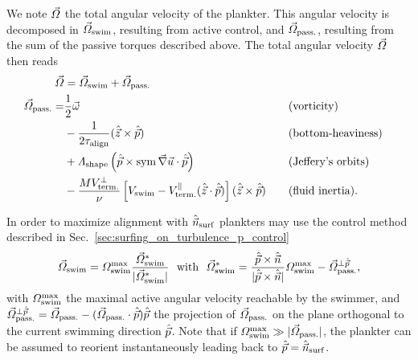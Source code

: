 We note $\vec{\varOmega}$ the total angular velocity of the plankter.
This angular velocity is decomposed in $\vec{\varOmega}_{\mathrm{swim}}$, resulting from active control, and $\vec{\varOmega}_{\mathrm{pass.}}$, resulting from the sum of the passive torques described above.
The total angular velocity $\vec{\varOmega}$ then reads
\begin{subequations}
	\begin{align}
		\vec{\varOmega} &= \vec{\varOmega}_{\mathrm{swim}} + \vec{\varOmega}_{\mathrm{pass.}}\\
		\vec{\varOmega}_{\mathrm{pass.}} = &\frac{1}{2} \vec{\omega} \quad &&\text{(vorticity)}\\ 
		&- \frac{1}{2\tau_{\mathrm{align}}} (\hat{\vec{z}} \times \hat{\vec{p}}) \quad &&\text{(bottom-heaviness)}\\ 
		&+\varLambda_{\mathrm{shape}} \left( \hat{\vec{p}} \times \operatorname{sym} \vec{\nabla} \vec{u} \cdot \hat{\vec{p}} \right) \quad &&\text{(Jeffery's orbits)}\\
		&-\frac{M V_{\mathrm{term.}}^\perp}{\nu} \left[ V_{\mathrm{swim}} - V_{\mathrm{term.}}^\parallel (\hat{\vec{z}} \cdot \hat{\vec{p}}) \right] (\hat{\vec{z}} \times \hat{\vec{p}}) \quad &&\text{(fluid inertia)}.
	\end{align}
\end{subequations}

In order to maximize alignment with $\hat{\vec{n}}_{\mathrm{surf}}$ plankters may use the control method described in Sec.~\ref{sec:surfing_on_turbulence_p_control}
\begin{equation}
	\label{turb:eq:control_solution}
	\vec{\varOmega}_{\mathrm{swim}} = \varOmega_{\mathrm{swim}}^{\max} \frac{\vec{\varOmega}_{\mathrm{swim}}^*}{\lvert\vec{\varOmega}_{\mathrm{swim}}^*\rvert} ~ \text{ with } ~ \vec{\varOmega}_{\mathrm{swim}}^* = \frac{\hat{\vec{p}} \times \hat{\vec{n}}}{\lvert\hat{\vec{p}} \times \hat{\vec{n}}\rvert} \varOmega_{\mathrm{swim}}^{\max} - \vec{\varOmega}_{\mathrm{pass.}}^{\perp \hat{\vec{p}}},
\end{equation}
with $\varOmega_{\mathrm{swim}}^{\max}$ the maximal active angular velocity reachable by the swimmer, and $\vec{\varOmega}_{\mathrm{pass.}}^{\perp \hat{\vec{p}}} = \vec{\varOmega}_{\mathrm{pass.}} - ( \vec{\varOmega}_{\mathrm{pass.}} \cdot \hat{\vec{p}} ) \hat{\vec{p}}$ the projection of $\vec{\varOmega}_{\mathrm{pass.}}$ on the plane orthogonal to the current swimming direction $\hat{\vec{p}}$.
Note that if $\varOmega_{\mathrm{swim}}^{\max} \gg \lvert\vec{\varOmega}_{\mathrm{pass.}}\rvert$, the plankter can be assumed to reorient instantaneously leading back to $\hat{\vec{p}} = \hat{\vec{n}}_{\mathrm{surf}}$.

